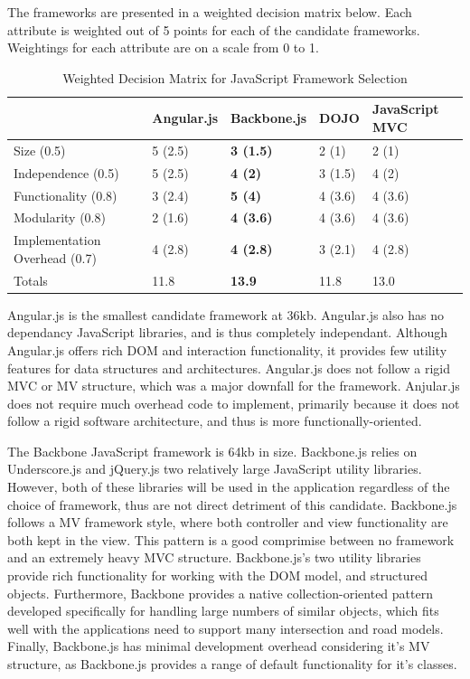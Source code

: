 \documentclass{report}
\begin{document}
The frameworks are presented in a weighted decision matrix below. Each attribute is weighted out of 5 points for each of the candidate frameworks. Weightings for each attribute are on a scale from 0 to 1.

\begin{table}
\centering
    \begin{tabular}{l|llll}
    ~                             & Angular.js & \textbf{Backbone.js} & DOJO    & JavaScript MVC \\ \hline
    Size (0.5)                    & 5 (2.5)    & \textbf{3 (1.5)}     & 2 (1)   & 2 (1)        \\
    Independence (0.5)            & 5 (2.5)    & \textbf{4 (2)}       & 3 (1.5)   & 4 (2)          \\
    Functionality (0.8)           & 3 (2.4)    & \textbf{5 (4)}       & 4 (3.6)   & 4 (3.6)          \\
    Modularity (0.8)              & 2 (1.6)    & \textbf{4 (3.6)}     & 4 (3.6) & 4 (3.6)        \\
    Implementation Overhead (0.7) & 4 (2.8)    & \textbf{4 (2.8)}     & 3 (2.1) & 4 (2.8)        \\ \hline
    Totals                        & 11.8       & \textbf{13.9}        & 11.8    & 13.0           \\
    \end{tabular}
\caption{Weighted Decision Matrix for JavaScript Framework Selection}
\label{table:framework-matrix}
\end{table}

Angular.js is the smallest candidate framework at 36kb. Angular.js also has no dependancy JavaScript libraries, and is thus completely independant. Although Angular.js offers rich DOM and interaction functionality, it provides few utility features for data structures and architectures. Angular.js does not follow a rigid MVC or MV structure, which was a major downfall for the framework. Anjular.js does not require much overhead code to implement, primarily because it does not follow a rigid software architecture, and thus is more functionally-oriented.

The Backbone JavaScript framework is 64kb in size. Backbone.js relies on Underscore.js and jQuery.js two relatively large JavaScript utility libraries. However, both of these libraries will be used in the application regardless of the choice of framework, thus are not direct detriment of this candidate. Backbone.js follows a MV framework style, where both controller and view functionality are both kept in the view. This pattern is a good comprimise between no framework and an extremely heavy MVC structure. Backbone.js's two utility libraries provide rich functionality for working with the DOM model, and structured objects. Furthermore, Backbone provides a native collection-oriented pattern developed specifically for handling large numbers of similar objects, which fits well with the applications need to support many intersection and road models. Finally, Backbone.js has minimal development overhead considering it's MV structure, as Backbone.js provides a range of default functionality for it's classes.
\end{document}
